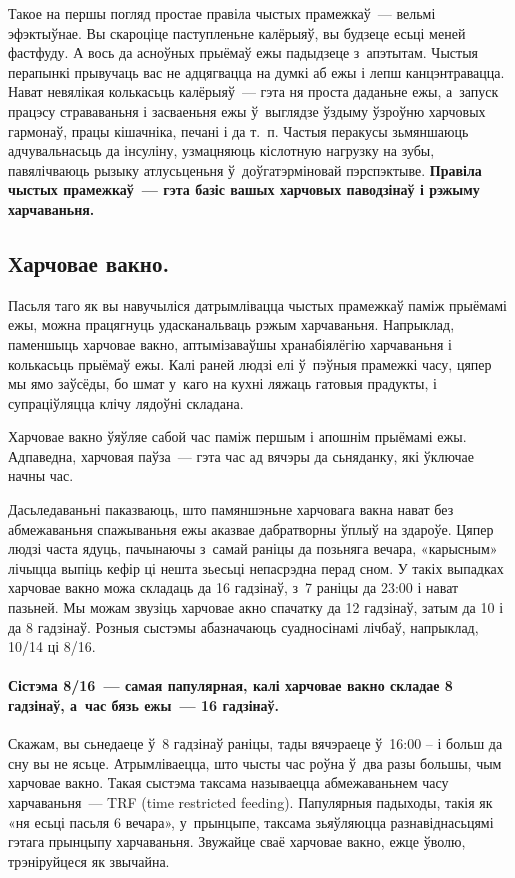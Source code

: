 Такое на першы погляд простае правіла чыстых прамежкаў~--- вельмі эфэктыўнае. Вы скароціце паступленьне калёрыяў, вы будзеце есьці меней фастфуду. А вось да асноўных прыёмаў ежы падыдзеце з~апэтытам. Чыстыя перапынкі прывучаць вас не адцягвацца на думкі аб ежы і лепш канцэнтравацца. Нават невялікая колькасьць калёрыяў~--- гэта ня проста даданьне ежы, а~запуск працэсу страваваньня і засваеньня ежы ў~выглядзе ўздыму ўзроўню харчовых гармонаў, працы кішачніка, печані і да т.~п. Частыя перакусы зьмяншаюць адчувальнасьць да інсуліну, узмацняюць кіслотную нагрузку на зубы, павялічваюць рызыку атлусьценьня ў~доўгатэрміновай пэрспэктыве. \textbf{Правіла чыстых прамежкаў~--- гэта базіс вашых харчовых паводзінаў і рэжыму харчаваньня.}

\subsection*{Харчовае вакно.}
Пасьля таго як вы навучыліся датрымлівацца чыстых прамежкаў паміж прыёмамі ежы, можна працягнуць удасканальваць рэжым харчаваньня. Напрыклад, паменшыць харчовае вакно, аптымізаваўшы хранабіялёгію харчаваньня і колькасьць прыёмаў ежы. Калі раней людзі елі ў~пэўныя прамежкі часу, цяпер мы ямо заўсёды, бо шмат у~каго на кухні ляжаць гатовыя прадукты, і супраціўляцца клічу лядоўні складана. 


Харчовае вакно ўяўляе сабой час паміж першым і апошнім прыёмамі ежы. Адпаведна, харчовая паўза~--- гэта час ад вячэры да сьняданку, які ўключае начны час. 

Дасьледаваньні паказваюць, што памяншэньне харчовага вакна нават без абмежаваньня спажываньня ежы аказвае дабратворны ўплыў на здароўе. Цяпер людзі часта ядуць, пачынаючы з~самай раніцы да позьняга вечара, «карысным» лічыцца выпіць кефір ці нешта зьесьці непасрэдна перад сном. У такіх выпадках харчовае вакно можа складаць да 16 гадзінаў, з~7 раніцы да 23:00 і нават пазьней. Мы можам звузіць харчовае акно спачатку да 12 гадзінаў, затым да 10 і да 8 гадзінаў. Розныя сыстэмы абазначаюць суадносінамі лічбаў, напрыклад, 10/14 ці 8/16.

\paragraph{Сістэма 8/16~--- самая папулярная, калі харчовае вакно складае 8 гадзінаў, а~час бязь ежы~--- 16 гадзінаў.} Скажам, вы сьнедаеце ў~8 гадзінаў раніцы, тады вячэраеце ў~16:00 -- і больш да сну вы не ясьце. Атрымліваецца, што чысты час роўна ў~два разы большы, чым харчовае вакно. Такая сыстэма таксама называецца абмежаваньнем часу харчаваньня~--- TRF (time restricted feeding). Папулярныя падыходы, такія як «ня есьці пасьля 6 вечара», у~прынцыпе, таксама зьяўляюцца разнавіднасьцямі гэтага прынцыпу харчаваньня. Звужайце сваё харчовае вакно, ежце ўволю, трэніруйцеся як звычайна.

